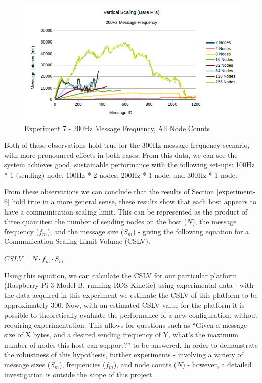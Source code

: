 \documentclass[../dissertation.tex]{subfiles}
\begin{document}
\begin{figure}[H]
\centering
\includegraphics[width=\textwidth]{images/experiment7/vertical_scaling_200hz_all_node_counts.png}
\caption{Experiment 7 - 200Hz Message Frequency, All Node Counts}
\label{exp7-200hz-allnodes}
\end{figure}

Both of these observations hold true for the 300Hz message frequency scenario, with more pronounced effects in both cases. From this data, we can see the system achieves good, sustainable performance with the following set-ups: 100Hz * 1 (sending) node, 100Hz * 2 nodes, 200Hz * 1 node, and 300Hz * 1 node.

From these observations we can conclude that the results of Section \ref{experiment-6} hold true in a more general sense, these results show that each host appears to have a communication scaling limit. This can be represented as the product of three quantites: the number of sending nodes on the host ($N$), the message frequency ($f_m$), and the message size ($S_m$) - giving the following equation for a Communication Scaling Limit Volume (CSLV):

\begin{center}
$CSLV = N \cdot f_m \cdot S_m$
\end{center}

Using this equation, we can calculate the CSLV for our particular platform (Raspberry Pi 3 Model B, running ROS Kinetic) using experimental data - with the data acquired in this experiment we estimate the CSLV of this platform to be approximately 300. Now, with an estimated CSLV value for the platform it is possible to theoretically evaluate the performance of a new configuration, without requiring experimentation. This allows for questions such as ``Given a message size of X bytes, and a desired sending frequency of Y, what's the maximum number of nodes this host can support?'' to be answered. In order to demonstrate the robustness of this hypothesis, further experiments - involving a variety of message sizes ($S_m$), frequencies ($f_m$), and node counts ($N$) - however, a detailed investigation is outside the scope of this project.
\end{document}
